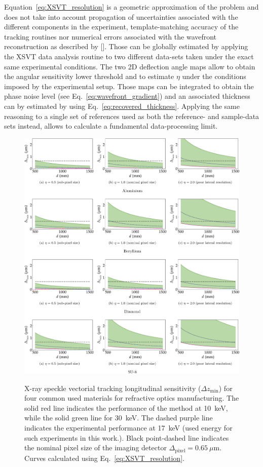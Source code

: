 \begin{refsection}
Equation~\ref{eq:XSVT_resolution} is a geometric approximation of the problem and does not take into account propagation of uncertainties associated with the different components in the experiment, template-matching accuracy of the tracking routines nor numerical errors associated with the wavefront reconstruction as described by [\cite{Fried1977, Southwell1980}]. Those can be globally estimated by applying the XSVT data analysis routine to two different data-sets taken under the exact same experimental conditions. The two 2D deflection angle maps allow to obtain the angular sensitivity lower threshold and to estimate $\eta$ under the conditions imposed by the experimental setup. Those maps can be integrated to obtain the phase noise level (see Eq.~\ref{eq:wavefront_gradient}) and an associated thickness can by estimated by using Eq.~\ref{eq:recovered_thickness}. Applying the same reasoning to a single set of references used as both the reference- and sample-data sets instead, allows to calculate a fundamental data-processing limit.

\clearpage

\begin{figure}[t]
        \centering
        {\includegraphics[width=1.0\linewidth]{figures/ch04b/sensitivity_2.pdf}}
        \caption[XSVT sensitivity calculation]{X-ray speckle vectorial tracking longitudinal sensitivity ($\Delta{z_{\text{min}}}$) for four common used materials for refractive optics manufacturing. The solid red line indicates the performance of the method at 10~keV, while the solid green line for 30~keV. The dashed purple line indicates the experimental performance at 17~keV (used energy for such experiments in this work.). Black point-dashed line indicates the nominal pixel size of the imaging detector $\Delta_\text{pixel}=0.65~\mu$m. Curves calculated using Eq.~\ref{eq:XSVT_resolution}.}\label{fig:sensitivity_2}
\end{figure}


\end{refsection}
